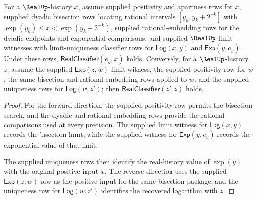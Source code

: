 \begin{theorem}
\label{thm:real-analytic-log-exp-inverse}
For a $\RealUp$-history $x$, assume supplied positivity and apartness rows for $x$, supplied dyadic bisection rows locating rational intervals $[y_k,y_k+2^{-k}]$ with $\exp(y_k) \leq x < \exp(y_k+2^{-k})$, supplied rational-embedding rows for the dyadic endpoints and exponential comparisons, and supplied $\RealUp$ limit witnesses with limit-uniqueness classifier rows for $\mathsf{Log}(x,y)$ and $\mathsf{Exp}(y,e_y)$. Under these rows, $\mathsf{RealClassifier}(e_y,x)$ holds. Conversely, for a $\RealUp$-history $z$, assume the supplied $\mathsf{Exp}(z,w)$ limit witness, the supplied positivity row for $w$, the same bisection and rational-embedding rows applied to $w$, and the supplied uniqueness rows for $\mathsf{Log}(w,z')$; then $\mathsf{RealClassifier}(z',z)$ holds.
\end{theorem}
\begin{proof}
For the forward direction, the supplied positivity row permits the bisection search, and the dyadic and rational-embedding rows provide the rational comparisons used at every precision. The supplied limit witness for $\mathsf{Log}(x,y)$ records the bisection limit, while the supplied witness for $\mathsf{Exp}(y,e_y)$ records the exponential value of that limit.

The supplied uniqueness rows then identify the real-history value of $\exp(y)$ with the original positive input $x$. The reverse direction uses the supplied $\mathsf{Exp}(z,w)$ row as the positive input for the same bisection package, and the uniqueness row for $\mathsf{Log}(w,z')$ identifies the recovered logarithm with $z$.
\end{proof}

